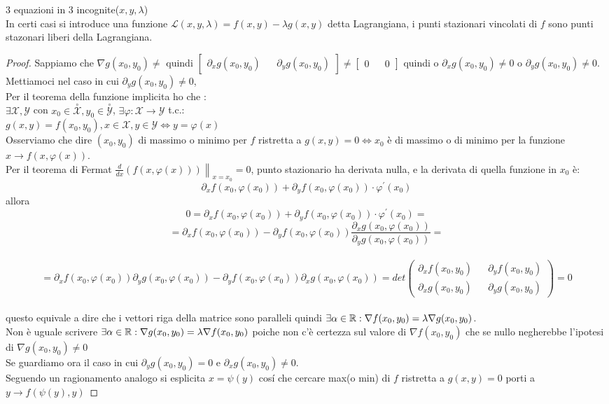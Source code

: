 3 equazioni in 3 incognite($x,y,\lambda$)\\
In certi casi si introduce una funzione $\mathcal{L}(x,y,\lambda) = f(x,y)-\lambda g(x,y)$ detta Lagrangiana, i punti stazionari vincolati di $f$ sono punti stazonari liberi della Lagrangiana.\\
\begin{proof}
	Sappiamo che $\nabla g(x_0,y_0)\ne$ quindi $\begin{bmatrix}\partial_xg(x_0,y_0) &&\partial_yg(x_0,y_0)\end{bmatrix}\ne\begin{bmatrix}0&&0\end{bmatrix}$ quindi o $\partial_xg(x_0,y_0)\ne 0$ o $\partial_yg(x_0,y_0)\ne 0$.
	Mettiamoci nel caso in cui $\partial_yg(x_0,y_0)\ne 0$,\\
    Per il teorema della funzione implicita ho che :\\
	$\exists\mathcal{X},\mathcal{Y}$ con $x_0\in\overset{\circ}{\mathcal{X}}, y_0\in\overset{\circ}{\mathcal{Y}}$, $\exists\varphi:\mathcal{X}\rightarrow\mathcal{Y}$ t.c.:\\
	$g(x,y)=f(x_0,y_0), x\in\mathcal{X}, y\in\mathcal{Y} \Leftrightarrow y=\varphi(x)$\\
	Osserviamo che dire $(x_0,y_0)$ di massimo o minimo per $f$ ristretta a $g(x,y)=0\Leftrightarrow x_0$ è di massimo o di minimo per la funzione $x\rightarrow f(x,\varphi(x))$.\\
	Per il teorema di Fermat $\left.\frac{d}{dx}(f(x,\varphi(x)))\right\|_{x=x_0}=0$, punto stazionario ha derivata nulla, e la derivata di quella funzione in $x_0$ è:
	$$\partial_xf(x_0,\varphi(x_0))+\partial_yf(x_0,\varphi(x_0))\cdot\varphi^{'}(x_0)$$ 
	allora
	$$0=\partial_xf(x_0,\varphi(x_0))+\partial_yf(x_0,\varphi(x_0))\cdot\varphi^{'}(x_0)=$$
	$$=\partial_xf(x_0,\varphi(x_0))-\partial_yf(x_0,\varphi(x_0))\frac{\partial_xg(x_0,\varphi(x_0))}{\partial_yg(x_0,\varphi(x_0))}=$$\\
	$$=\partial_xf(x_0,\varphi(x_0))\partial_yg(x_0,\varphi(x_0))-\partial_yf(x_0,\varphi(x_0))\partial_xg(x_0,\varphi(x_0))=det\left(\begin{matrix}\partial_xf(x_0,y_0)&&\partial_yf(x_0,y_0)\\\partial_xg(x_0,y_0)&&\partial_yg(x_0,y_0)\end{matrix}\right)=0$$\\
	questo equivale a dire che i vettori riga della matrice sono paralleli quindi $\exists\alpha\in \mathbb{R} : \nabla f(x_0,y_0)=\lambda\nabla g(x_0,y_0)$.\\
	Non è uguale scrivere $\exists\alpha\in \mathbb{R} : \nabla g(x_0,y_0)=\lambda\nabla f(x_0,y_0)$ poiche non c'è certezza sul valore di $\nabla f(x_0,y_0)$ che se nullo negherebbe l'ipotesi di $\nabla g(x_0,y_0)\ne 0$\\
	Se guardiamo ora il caso in cui $\partial_yg(x_0,y_0)=0$ e $\partial_xg(x_0,y_0)\ne 0$.\\
	Seguendo un ragionamento analogo si esplicita $x=\psi(y)$ cos\'i che cercare max(o min) di $f$ ristretta a $g(x,y)=0$ porti a $y\rightarrow f(\psi(y),y)$ 
\end{proof}
